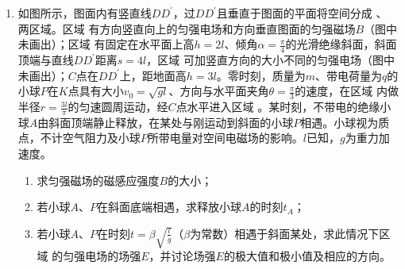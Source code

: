 \begin{enumerate}[leftmargin=0em]


\newpage
\item
{}
如图所示，图面内有竖直线$ DD ^{\prime} $，过$ DD ^{\prime} $且垂直于图面的平面将空间分成  、  两区域。区域  有方向竖直向上的匀强电场和方向垂直图面的匀强磁场$ B $（图中未画出）；区域  有固定在水平面上高$ h=2l $、倾角$ \alpha=\frac{\pi}{4} $的光滑绝缘斜面，斜面顶端与直线$ DD ^{\prime} $距离$ s=4l $，区域  可加竖直方向的大小不同的匀强电场（图中未画出）；$ C $点在$ DD ^{\prime} $上，距地面高$ h=3l $。零时刻，质量为$ m $、带电荷量为$ q $的小球$ P $在$ K $点具有大小$v _ { 0 } = \sqrt { g l }$、方向与水平面夹角$ \theta=\frac{\pi}{3} $的速度，在区域  内做半径$ r=\frac{3l}{\pi} $的匀速圆周运动，经$ C $点水平进入区域  。某时刻，不带电的绝缘小球$ A $由斜面顶端静止释放，在某处与刚运动到斜面的小球$ P $相遇。小球视为质点，不计空气阻力及小球$ P $所带电量对空间电磁场的影响。$ l $已知，$ g $为重力加速度。
\begin{enumerate}
\renewcommand{\labelenumi}{\arabic{enumi}.}
\item
求匀强磁场的磁感应强度$ B $的大小；
\item 
若小球$ A $、$ P $在斜面底端相遇，求释放小球$ A $的时刻$ t_{A} $；
\item 
若小球$ A $、$ P $在时刻$t = \beta \sqrt { \frac{l}{g} }$（$ \beta $为常数）相遇于斜面某处，求此情况下区域  的匀强电场的场强$ E $，并讨论场强$ E $的极大值和极小值及相应的方向。





\end{enumerate}
\end{enumerate}
